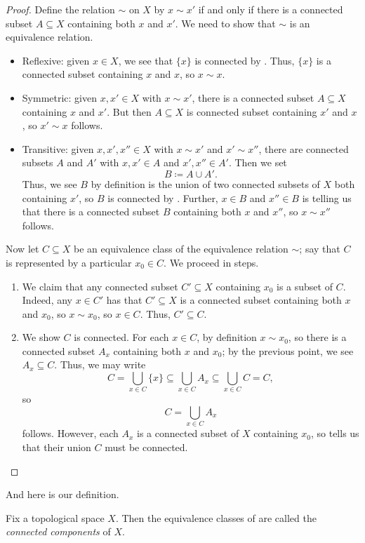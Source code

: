 \documentclass[../notes.tex]{subfiles}
\begin{document}
\begin{proof}
	Define the relation $\sim$ on $X$ by $x\sim x'$ if and only if there is a connected subset $A\subseteq X$ containing both $x$ and $x'$. We need to show that $\sim$ is an equivalence relation.
	\begin{itemize}
		\item Reflexive: given $x\in X$, we see that $\{x\}$ is connected by . Thus, $\{x\}$ is a connected subset containing $x$ and $x$, so $x\sim x$.
		\item Symmetric: given $x,x'\in X$ with $x\sim x'$, there is a connected subset $A\subseteq X$ containing $x$ and $x'$. But then $A\subseteq X$ is connected subset containing $x'$ and $x$, so $x'\sim x$ follows.
		\item Transitive: given $x,x',x''\in X$ with $x\sim x'$ and $x'\sim x''$, there are connected subsets $A$ and $A'$ with $x,x'\in A$ and $x',x''\in A'$. Then we set
		\[B\coloneqq A\cup A'.\]
		Thus, we see $B$ by definition is the union of two connected subsets of $X$ both containing $x'$, so $B$ is connected by . Further, $x\in B$ and $x''\in B$ is telling us that there is a connected subset $B$ containing both $x$ and $x''$, so $x\sim x''$ follows.
	\end{itemize}
	Now let $C\subseteq X$ be an equivalence class of the equivalence relation $\sim$; say that $C$ is represented by a particular $x_0\in C$. We proceed in steps.
	\begin{enumerate}
		\item We claim that {any connected subset $C'\subseteq X$ containing $x_0$ is a subset of $C$}. Indeed, any $x\in C'$ has that $C'\subseteq X$ is a connected subset containing both $x$ and $x_0$, so $x\sim x_0$, so $x\in C$. Thus, $C'\subseteq C$.
		\item We show $C$ is connected. For each $x\in C$, by definition $x\sim x_0$, so there is a connected subset $A_x$ containing both $x$ and $x_0$; by the previous point, we see $A_x\subseteq C$. Thus, we may write
		\[C=\bigcup_{x\in C}\{x\}\subseteq\bigcup_{x\in C}A_x\subseteq\bigcup_{x\in C}C=C,\]
		so
		\[C=\bigcup_{x\in C}A_x\]
		follows. However, each $A_x$ is a connected subset of $X$ containing $x_0$, so  tells us that their union $C$ must be connected.
		\qedhere
	\end{enumerate}
\end{proof}
And here is our definition.
\begin{definition}
	Fix a topological space $X$. Then the equivalence classes of  are called the \textit{connected components} of $X$.
\end{definition}
\end{document}
